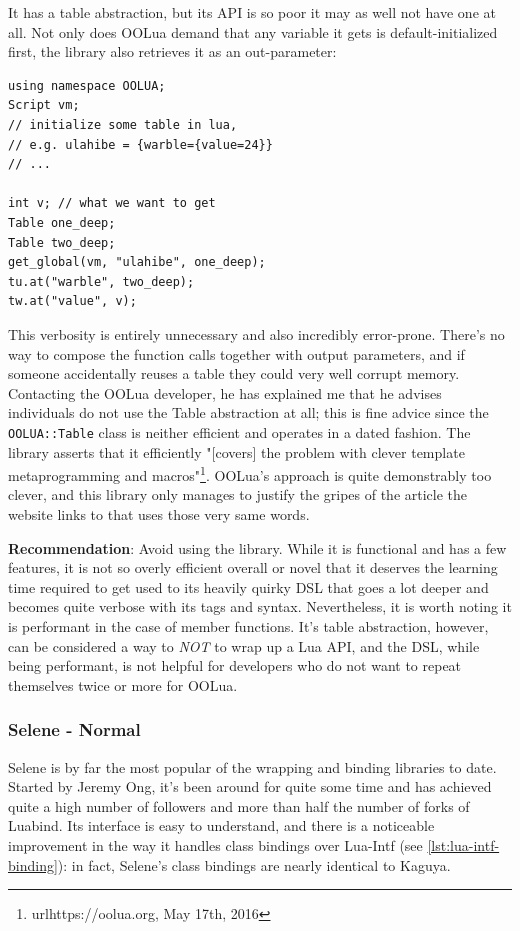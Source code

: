 \documentclass[conference,compsoc]{IEEEtran}
\begin{document}
It has a table abstraction, but its API is so poor it may as well not have one at all. Not only does OOLua demand that any variable it gets is default-initialized first, the library also retrieves it as an out-parameter:

\begin{lstlisting}
using namespace OOLUA;
Script vm;
// initialize some table in lua, 
// e.g. ulahibe = {warble={value=24}}
// ...

int v; // what we want to get
Table one_deep;
Table two_deep;
get_global(vm, "ulahibe", one_deep);
tu.at("warble", two_deep);
tw.at("value", v);
\end{lstlisting}

This verbosity is entirely unnecessary and also incredibly error-prone. There's no way to compose the function calls together with output parameters, and if someone accidentally reuses a table they could very well corrupt memory. Contacting the OOLua developer, he has explained me that he advises individuals do not use the Table abstraction at all; this is fine advice since the \lstinline|OOLUA::Table| class is neither efficient and operates in a dated fashion. The library asserts that it efficiently "[covers] the problem with clever template metaprogramming and macros"\footnote{url{https://oolua.org}, May 17th, 2016}. OOLua's approach is quite demonstrably too clever, and this library only manages to justify the gripes of the article the website links to that uses those very same words.

\textbf{Recommendation}: Avoid using the library. While it is functional and has a few features, it is not so overly efficient overall or novel that it deserves the learning time required to get used to its heavily quirky DSL that goes a lot deeper and becomes quite verbose with its tags and syntax. Nevertheless, it is worth noting it is performant in the case of member functions. It's table abstraction, however, can be considered a way to \emph{NOT} to wrap up a Lua API, and the DSL, while being performant, is not helpful for developers who do not want to repeat themselves twice or more for OOLua.

\subsubsection{Selene - Normal}

Selene\cite{selene} is by far the most popular of the wrapping and binding libraries to date. Started by Jeremy Ong, it's been around for quite some time and has achieved quite a high number of followers and more than half the number of forks of Luabind. Its interface is easy to understand, and there is a noticeable improvement in the way it handles class bindings over Lua-Intf (see \cref{lst:lua-intf-binding}): in fact, Selene's class bindings are nearly identical to Kaguya.
\end{document}
